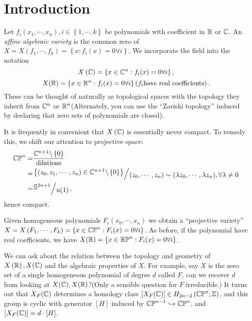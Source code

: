 \thispagestyle{empty}


\tableofcontents
\section{Introduction}
Let $f_i(x_1,\cdots ,x_n),i\in \left\{1,\cdots ,k\right\} $ be polynomials with coefficient in $\mathbb{R}$ or $\mathbb{C}$. An \textit{affine algebraic variety} is the common zero of $X=X(f_1,\cdots ,f_k)=\left\{x:f_i(x)=0\forall i\right\} $. We incorporate the field into the notation 
\[
  X\left( \mathbb{C} \right) =\left\{x\in \mathbb{C}^{n}:f_i(x)=0\forall i\right\} ,
\] 
\[
  X(\mathbb{R})=\left\{x\in \mathbb{R}^{n}:f_i(x)=0 \forall i\right\} \left( f_i\text{have real coefficients} \right). 
\] 
These can be thought of naturally as topological spaces with the topology they inherit from $\mathbb{C}^{n}$ or $\mathbb{R}^{n}$(Alternately, you can use the ``Zariski topology'' induced by declaring that zero sets of polynomials are closed). 

It is frequently in convenient that $X\left( \mathbb{C} \right) $ is essentially never compact. To remedy this, we shift our attention to projective space:
\begin{align*}
  \CP^{n}= &\frac{\C^{n+1}\backslash \left\{0\right\} }{\text{dilations}}\\
  =&\sfrac{\left\{\left( z_0,z_1,\cdots ,z_{n} \right) \in \C^{n+1}\backslash \left\{0\right\} \right\} }{(z_0,\cdots ,z_n)\sim (\lambda z_0,\cdots ,\lambda z_n), \forall \lambda \neq 0}\\
  = & \sfrac{\Sph^{2n+1}}{u(1)},  
\end{align*}
hence compact.

Given homogeneous polynomials $F_i(x_0,\cdots ,x_n)$ we obtain a ``projective variety'' $X=X\left( F_1,\cdots ,F_k \right) =\left\{x\in \mathbb{CP}^{n}:F_i(x)=0\forall i\right\} $. As before, if the polynomial have real coefficients, we have $X(\mathbb{R})=\left\{x\in \mathbb{RP}^{n}:F_i(x)=0\forall i\right\} $. 

We can ask about the relation between the topology and geometry of $X\left( \mathbb{R} \right) ,X(\mathbb{C})$ and the algebraic properties of $X$. For example, say $X$ is the zero set of a single homogeneous polynomial of degree $d$ called $F$, can we recover $d$ from looking at $X(\mathbb{C}),X(\mathbb{R})$?(Only a sensible question for $F$ irreducible.) It turns out that $X_F(\mathbb{C})$ determines a homology class $\left[ X_F(\mathbb{C}) \right] \in H_{2n-2}\left( \mathbb{CP}^{n};\mathbb{Z} \right) $, and this group is cyclic with generator $\left[ H \right] $ induced by $\mathbb{CP}^{n-1}\hookrightarrow \mathbb{CP}^{n}$, and $\left[ X_F(\mathbb{C}) \right] =d\cdot \left[ H \right] $.

